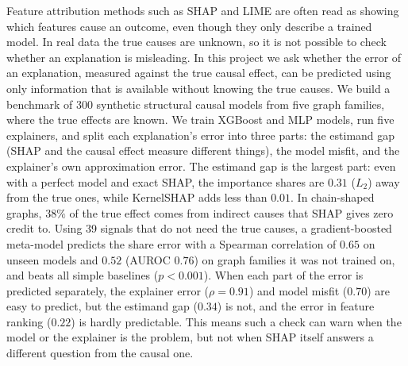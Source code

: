 Feature attribution methods such as SHAP and LIME are often read as showing which features cause an outcome, even though they only describe a trained model. In real data the true causes are unknown, so it is not possible to check whether an explanation is misleading. In this project we ask whether the error of an explanation, measured against the true causal effect, can be predicted using only information that is available without knowing the true causes. We build a benchmark of 300 synthetic structural causal models from five graph families, where the true effects are known. We train XGBoost and MLP models, run five explainers, and split each explanation's error into three parts: the estimand gap (SHAP and the causal effect measure different things), the model misfit, and the explainer's own approximation error. The estimand gap is the largest part: even with a perfect model and exact SHAP, the importance shares are $0.31$ ($L_2$) away from the true ones, while KernelSHAP adds less than $0.01$. In chain-shaped graphs, $38\%$ of the true effect comes from indirect causes that SHAP gives zero credit to. Using 39 signals that do not need the true causes, a gradient-boosted meta-model predicts the share error with a Spearman correlation of $0.65$ on unseen models and $0.52$ (AUROC $0.76$) on graph families it was not trained on, and beats all simple baselines ($p < 0.001$). When each part of the error is predicted separately, the explainer error ($\rho = 0.91$) and model misfit ($0.70$) are easy to predict, but the estimand gap ($0.34$) is not, and the error in feature ranking ($0.22$) is hardly predictable. This means such a check can warn when the model or the explainer is the problem, but not when SHAP itself answers a different question from the causal one.

